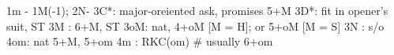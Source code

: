 1m - 1M(-1); 2N-
3C*: major-oreiented ask, promises 5+M
3D*: fit in opener's suit, ST
3M : 6+M, ST
3oM: nat, 4+oM [M = H]; or 5+oM [M = S]
3N : s/o
4om: nat 5+M, 5+om
4m : RKC(om)  # usually 6+om